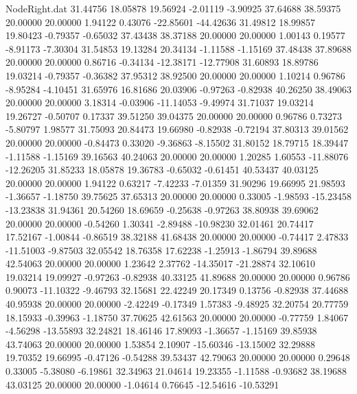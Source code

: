 \begin{filecontents}{NodeRight.dat}
  31.44756   18.05878   19.56924    -2.01119   -3.90925   37.64688   38.59375   20.00000   20.00000    1.94122    0.43076  -22.85601  -44.42636
  31.49812   18.99857   19.80423    -0.79357   -0.65032   37.43438   38.37188   20.00000   20.00000    1.00143    0.19577   -8.91173   -7.30304
  31.54853   19.13284   20.34134    -1.11588   -1.15169   37.48438   37.89688   20.00000   20.00000    0.86716   -0.34134  -12.38171  -12.77908
  31.60893   18.89786   19.03214    -0.79357   -0.36382   37.95312   38.92500   20.00000   20.00000    1.10214    0.96786   -8.95284   -4.10451
  31.65976   16.81686   20.03906    -0.97263   -0.82938   40.26250   38.49063   20.00000   20.00000    3.18314   -0.03906  -11.14053   -9.49974
  31.71037   19.03214   19.26727    -0.50707    0.17337   39.51250   39.04375   20.00000   20.00000    0.96786    0.73273   -5.80797    1.98577
  31.75093   20.84473   19.66980    -0.82938   -0.72194   37.80313   39.01562   20.00000   20.00000   -0.84473    0.33020   -9.36863   -8.15502
  31.80152   18.79715   18.39447    -1.11588   -1.15169   39.16563   40.24063   20.00000   20.00000    1.20285    1.60553  -11.88076  -12.26205
  31.85233   18.05878   19.36783    -0.65032   -0.61451   40.53437   40.03125   20.00000   20.00000    1.94122    0.63217   -7.42233   -7.01359
  31.90296   19.66995   21.98593    -1.36657   -1.18750   39.75625   37.65313   20.00000   20.00000    0.33005   -1.98593  -15.23458  -13.23838
  31.94361   20.54260   18.69659    -0.25638   -0.97263   38.80938   39.69062   20.00000   20.00000   -0.54260    1.30341   -2.89488  -10.98230
  32.01461   20.74417   17.52167    -1.00844   -0.86519   38.32188   41.68438   20.00000   20.00000   -0.74417    2.47833  -11.51003   -9.87503
  32.05542   18.76358   17.62238    -1.25913   -1.86794   39.89688   42.54063   20.00000   20.00000    1.23642    2.37762  -14.35017  -21.28874
  32.10610   19.03214   19.09927    -0.97263   -0.82938   40.33125   41.89688   20.00000   20.00000    0.96786    0.90073  -11.10322   -9.46793
  32.15681   22.42249   20.17349     0.13756   -0.82938   37.44688   40.95938   20.00000   20.00000   -2.42249   -0.17349    1.57383   -9.48925
  32.20754   20.77759   18.15933    -0.39963   -1.18750   37.70625   42.61563   20.00000   20.00000   -0.77759    1.84067   -4.56298  -13.55893
  32.24821   18.46146   17.89093    -1.36657   -1.15169   39.85938   43.74063   20.00000   20.00000    1.53854    2.10907  -15.60346  -13.15002
  32.29888   19.70352   19.66995    -0.47126   -0.54288   39.53437   42.79063   20.00000   20.00000    0.29648    0.33005   -5.38080   -6.19861
  32.34963   21.04614   19.23355    -1.11588   -0.93682   38.19688   43.03125   20.00000   20.00000   -1.04614    0.76645  -12.54616  -10.53291

\end{filecontents}
